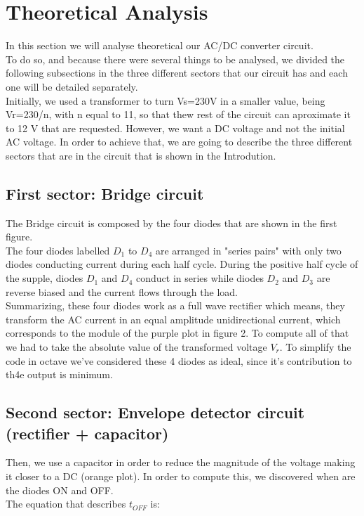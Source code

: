 \section{Theoretical Analysis}
\label{sec:analysis}

In this section we will analyse theoretical our AC/DC converter circuit. \\
To do so, and because there were several things to be analysed, we divided the following subsections in the three different sectors that our circuit has and each one will be detailed separately.\\
Initially, we used a transformer to turn Vs=230V in a smaller value, being Vr=230/n, with n equal to 11, so that thew
rest of the circuit can aproximate it to 12 V that are requested. However, we want a DC voltage and not the initial AC voltage. In order
to achieve that, we are going to describe the three different sectors that are in the circuit that is shown in the Introdution.\\


\subsection{First sector: Bridge circuit}

The Bridge circuit is composed by the four diodes that are shown in the first figure.\\
The four diodes labelled $D_1$ to $D_4$ are arranged in "series pairs" with only two diodes conducting current during each half cycle. During the positive half cycle of the supple, diodes $D_1$ and $D_4$ conduct in series while diodes $D_2$ and $D_3$ are reverse biased and the current flows through the load.\\
Summarizing, these four diodes work as a full wave rectifier which means, they transform the AC current in an equal
amplitude unidirectional current, which corresponds to the module of the purple plot in figure 2. To compute all of that we had to take the absolute value of the transformed voltage $V_r$. 
To simplify the code in octave we've considered these 4 diodes as ideal, since it's contribution to th4e output is minimum.

\subsection{Second sector: Envelope detector circuit (rectifier + capacitor)}

Then, we use a capacitor in order to reduce the magnitude of the voltage making it closer to a DC (orange plot).
In order to compute this, we discovered when are the diodes ON and OFF.\\
The equation that describes $t_{OFF}$ is:

